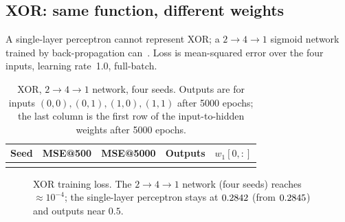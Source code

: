 \documentclass[conference]{IEEEtran}
\begin{document}
\subsection{XOR: same function, different weights}
A single-layer perceptron cannot represent XOR; a $2\!\to\!4\!\to\!1$ sigmoid network trained by back-propagation can~\cite{rumelhart1986}. Loss is mean-squared error over the four inputs, learning rate~1.0, full-batch.

\begin{table}[t]
\caption{XOR, $2\!\to\!4\!\to\!1$ network, four seeds. Outputs are for inputs $(0,0),(0,1),(1,0),(1,1)$ after 5000 epochs; the last column is the first row of the input-to-hidden weights after 5000 epochs.}
\label{tab:xor}
\centering\footnotesize
\setlength{\tabcolsep}{3pt}
\begin{tabular}{@{}lccll@{}}
\toprule
Seed & MSE@500 & MSE@5000 & Outputs & $w_1[0,:]$ \\
\midrule
\\
\bottomrule
\end{tabular}
\end{table}

\begin{figure}[t]
\centering
{}
\caption{XOR training loss. The $2\!\to\!4\!\to\!1$ network (four seeds) reaches $\approx 10^{-4}$; the single-layer perceptron stays at $0.2842$ (from $0.2845$) and outputs near $0.5$.}
\label{fig:xor}
\end{figure}
\end{document}
